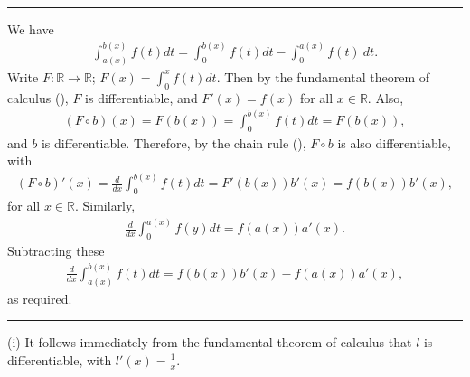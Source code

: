\documentclass[letterpaper,10pt,english]{jupyterBook}
\begin{document}
\bigskip\hrule\bigskip


\sphinxAtStartPar
{\hyperref[\detokenize{Problems:id73}]{}} We have
\begin{equation*}
\begin{split}
\int_{a(x)}^{b(x)} f(t)dt =  \int_0^{b(x)} f(t)dt - \int_0^{a(x)} f(t)\ dt.
\end{split}
\end{equation*}
\sphinxAtStartPar
Write \(F:\mathbb{R}\to\mathbb{R}\); \(F(x)=\int_0^x f(t)dt.\) Then by the fundamental theorem of calculus (), \(F\) is differentiable, and \( F'(x)=f(x)\) for all \(x\in\mathbb{R}\). Also,
\begin{equation*}
\begin{split}
(F\circ b)(x) = F(b(x)) = \int_0^{b(x)} f(t)dt=F(b(x)),
\end{split}
\end{equation*}
\sphinxAtStartPar
and \(b\) is differentiable. Therefore, by the chain rule (), \(F\circ b\) is also differentiable, with
\begin{equation*}
\begin{split}
(F\circ b)'(x) = \frac{d}{dx}\int_0^{b(x)} f(t)dt =F'(b(x))b'(x)=f(b(x))b'(x),
\end{split}
\end{equation*}
\sphinxAtStartPar
for all \(x\in\mathbb{R}\). Similarly,
\begin{equation*}
\begin{split}
\frac{d}{dx}\int_0^{a(x)} f(y)dt =f(a(x))a'(x).
\end{split}
\end{equation*}
\sphinxAtStartPar
Subtracting these
\begin{equation*}
\begin{split}
\frac{d}{dx}\int_{a(x)}^{b(x)} f(t)dt =f(b(x))b'(x) - f(a(x))a'(x),
\end{split}
\end{equation*}
\sphinxAtStartPar
as required.


\bigskip\hrule\bigskip


\sphinxAtStartPar
{\hyperref[\detokenize{Problems:id74}]{}}
(i) It follows immediately from the fundamental theorem of calculus that \(l\) is differentiable, with \(l'(x)=\frac{1}{x}\).
\end{document}
